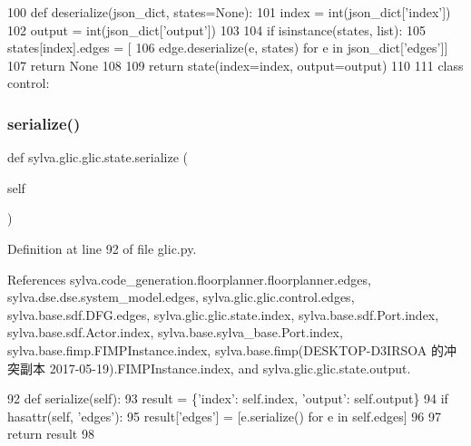 \begin{DoxyCode}
100         \textcolor{keyword}{def }deserialize(json\_dict, states=None):
101             index = int(json\_dict[\textcolor{stringliteral}{'index'}])
102             output = int(json\_dict[\textcolor{stringliteral}{'output'}])
103 
104             \textcolor{keywordflow}{if} isinstance(states, list):
105                 states[index].edges = [
106                     edge.deserialize(e, states) \textcolor{keywordflow}{for} e \textcolor{keywordflow}{in} json\_dict[\textcolor{stringliteral}{'edges'}]]
107                 \textcolor{keywordflow}{return} \textcolor{keywordtype}{None}
108 
109             \textcolor{keywordflow}{return} state(index=index, output=output)
110 
111     \textcolor{keyword}{class }control:
\end{DoxyCode}
\mbox{\label{classsylva_1_1glic_1_1glic_1_1state_a09708ff3d56142db919a172a0cb849e1}} 
\subsubsection{\texorpdfstring{serialize()}{serialize()}}
{\footnotesize\ttfamily def sylva.\+glic.\+glic.\+state.\+serialize (\begin{DoxyParamCaption}\item[{}]{self }\end{DoxyParamCaption})}



Definition at line 92 of file glic.\+py.



References sylva.\+code\+\_\+generation.\+floorplanner.\+floorplanner.\+edges, sylva.\+dse.\+dse.\+system\+\_\+model.\+edges, sylva.\+glic.\+glic.\+control.\+edges, sylva.\+base.\+sdf.\+D\+F\+G.\+edges, sylva.\+glic.\+glic.\+state.\+index, sylva.\+base.\+sdf.\+Port.\+index, sylva.\+base.\+sdf.\+Actor.\+index, sylva.\+base.\+sylva\+\_\+base.\+Port.\+index, sylva.\+base.\+fimp.\+F\+I\+M\+P\+Instance.\+index, sylva.\+base.\+fimp(\+D\+E\+S\+K\+T\+O\+P-\/\+D3\+I\+R\+S\+O\+A 的冲突副本 2017-\/05-\/19).\+F\+I\+M\+P\+Instance.\+index, and sylva.\+glic.\+glic.\+state.\+output.


\begin{DoxyCode}
92         \textcolor{keyword}{def }serialize(self):
93             result = \{\textcolor{stringliteral}{'index'}: self.index, \textcolor{stringliteral}{'output'}: self.output\}
94             \textcolor{keywordflow}{if} hasattr(self, \textcolor{stringliteral}{'edges'}):
95                 result[\textcolor{stringliteral}{'edges'}] = [e.serialize() \textcolor{keywordflow}{for} e \textcolor{keywordflow}{in} self.edges]
96 
97             \textcolor{keywordflow}{return} result
98 
\end{DoxyCode}


